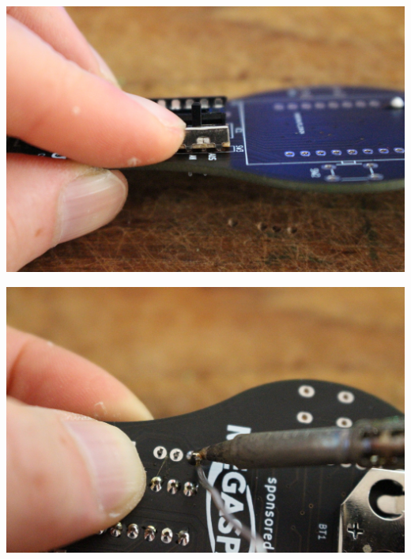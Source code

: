 \documentclass{article}
\begin{document}
\begin{minipage}[b]{0.5\textwidth}
	\includegraphics[width=\textwidth]{Bilder2022/IMG_8220.JPG}
\end{minipage}
\begin{minipage}[b]{0.5\textwidth}
	\includegraphics[width=\textwidth]{Bilder2022/IMG_8222.JPG}
\end{minipage}

\vspace{0.5cm}
\end{document}
